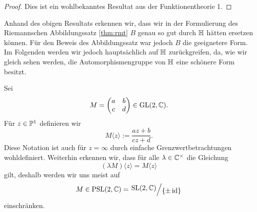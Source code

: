 \begin{proof}
  Dies ist ein wohlbekanntes Resultat aus der Funktionentheorie 1.
\end{proof}

\begin{rem}
  Anhand des obigen Resultats erkennen wir, dass wir in der Formulierung
  des Riemannschen Abbildungssatz \ref{thm:rmt} $B$ genau so gut durch
  $\h$ hätten ersetzen können. Für den Beweis des Abbildungssatz war
  jedoch $B$ die geeignetere Form. Im Folgenden werden wir jedoch
  hauptsächlich auf $\h$ zurückgreifen, da, wie wir gleich sehen
  werden, die Automorphismengruppe von $\h$ eine schönere Form besitzt.
\end{rem}

\begin{defin}
  Sei
  \[
  M =
  \begin{pmatrix}
    a & b \\
    c & d
  \end{pmatrix}
  \in \GL(2, \C).
  \]
  Für $z \in \P^1$ definieren wir
  \[
  M \langle z \rangle := \frac{az+b}{cz+d}.
  \]
  Diese Notation ist auch für $z = \infty$ durch einfache
  Grenzwertbetrachtungen wohldefiniert. Weiterhin erkennen wir, dass
  für alle $\lambda \in \C^\times$ die Gleichung
  \[
  (\lambda M) \langle z \rangle = M \langle z \rangle
  \]
  gilt, deshalb werden wir uns meist auf
  \[
  M \in \PSL(2, \C) = \quot{\SL(2, \C)}{\{\pm \id\}}
  \]
  einschränken.
\end{defin}

